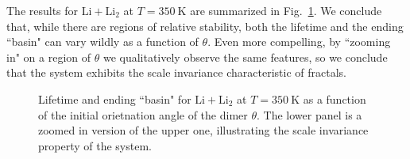 \documentclass[%
 reprint,
 amsmath,amssymb,
 aps,
 nofootinbib
]{revtex4-1}
\begin{document}
The results for $\mathrm{Li} + \mathrm{Li_2}$ at $T = 350~\mathrm{K}$ are summarized in Fig.~\ref{fig:chaos}. We conclude that, while there are regions of relative stability, both the lifetime and the ending ``basin" can vary wildly as a function of $\theta$. Even more compelling, by ``zooming in" on a region of $\theta$ we qualitatively observe the same features, so we conclude that the system exhibits the scale invariance characteristic of fractals.

\begin{figure}[htp]

\label{fig:chaos}
\caption{Lifetime and ending ``basin"  for $\mathrm{Li} + \mathrm{Li_2}$ at $T = 350~\mathrm{K}$ as a function of the initial orietnation angle of the dimer $\theta$. The lower panel is a zoomed in version of the upper one, illustrating the scale invariance property of the system.
}
\end{figure}
\end{document}
